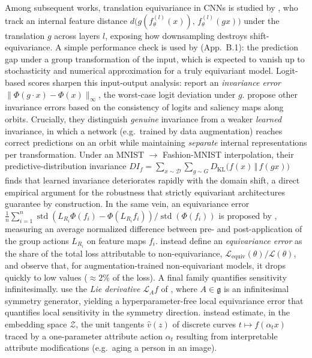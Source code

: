 \documentclass[mathematics,review,submit,moreauthors]{Definitions/mdpi}
\begin{document}
Among subsequent works, translation equivariance in CNNs is studied by \citet{zhang2019p3icml}, who track an internal feature distance $d\big(g(f_\theta^{(l)}(x)),\,f_\theta^{(l)}(gx)\big)$ under the translation $g$ across layers $l$, exposing how downsampling destroys shift-equivariance.
A simple performance check is used by \citet{finzi2020p3icml} (App.~B.1): the prediction gap under a group transformation of the input, which is expected to vanish up to stochasticity and numerical approximation for a truly equivariant model.
Logit-based scores sharpen this input-output analysis: \citet{hutchinson2021p3icml} report an \emph{invariance error} $\lVert \Phi(g\cdot x) - \Phi(x)\rVert_\infty$, the worst-case logit deviation under $g$.
\citet{moskalev2023p2awtagmlt} propose other invariance errors based on the consistency of logits and saliency maps along orbits.
Crucially, they distinguish \emph{genuine} invariance from a weaker \emph{learned} invariance, in which a network (e.g.\ trained by data augmentation) reaches correct predictions on an orbit while maintaining \emph{separate} internal representations per transformation.
Under an MNIST $\to$ Fashion-MNIST interpolation, their predictive-distribution invariance $DI_f = \sum_{x\sim \mathcal{D}}\sum_{g\sim G} D_{\mathrm{KL}}\big(f(x)\,\Vert\,f(gx)\big)$ finds that learned invariance deteriorates rapidly with the domain shift, a direct empirical argument for the robustness that strictly equivariant architectures guarantee by construction.
In the same vein, an equivariance error $\frac{1}{n} \sum_{i=1}^{n} \operatorname{std}(L_{R_i} \Phi(f_i) - \Phi(L_{R_i} f_i)) / \operatorname{std}(\Phi(f_i))$ is proposed by \citet{cohen2018}, measuring an average normalized difference between pre- and post-application of the group actions $L_{R_i}$ on feature maps $f_i$.
\citet{shen2026} instead define an \emph{equivariance error} as the share of the total loss attributable to non-equivariance, $\mathcal{L}_{\mathrm{equiv}}(\theta)/\mathcal{L}(\theta)$, and observe that, for augmentation-trained non-equivariant models, it drops quickly to low values ($\approx 2\%$ of the loss).\newline
A final family quantifies sensitivity infinitesimally.
\citet{gruver2024} use the \emph{Lie derivative} $\mathcal{L}_A f$ of , where $A\in\mathfrak{g}$ is an infinitesimal symmetry generator, yielding a hyperparameter-free local equivariance error that quantifies local sensitivity in the symmetry direction.
\citet{leroy2025} instead estimate, in the embedding space $\mathcal{Z}$, the unit tangents $\hat v(z)$ of discrete curves $t\mapsto f(\alpha_t x)$ traced by a one-parameter attribute action $\alpha_t$ resulting from interpretable attribute modifications (e.g.\ aging a person in an image).
\end{document}
